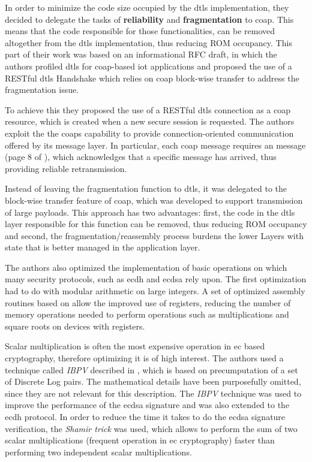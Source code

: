 \documentclass{llncs}
\begin{document}
In order to minimize the code size occupied by the \gls{dtls} implementation, they
decided to delegate the tasks of \textbf{reliability} and \textbf{fragmentation} to
\gls{coap}. This means that the code responsible for those functionalities,
can be removed altogether from the \gls{dtls} implementation, thus reducing ROM
occupancy. This part of their work was based on an informational RFC draft\cite{I-D.keoh-dtls-profile-iot}, in which the
authors profiled \gls{dtls} for \gls{coap}-based \gls{iot} applications and proposed
the use of a RESTful \gls{dtls} Handshake which relies on \gls{coap} block-wise
transfer to address the fragmentation issue.

To achieve this they  proposed the use of a RESTful \gls{dtls} connection as a \gls{coap} resource,
which is created when a new secure session is requested.
The authors exploit the the \gls{coap}s capability to provide connection-oriented
communication offered by its message layer. In particular, each 
\gls{coap} message requires an  message (page 8 of \cite{RFC7252}),
which acknowledges that a specific  message has arrived, thus
providing reliable retransmission.

Instead of leaving the fragmentation function to \gls{dtls}, it was
delegated to the block-wise transfer feature of \gls{coap}\cite{RFC7959}, which was developed
to support transmission of large payloads. This approach has two advantages: first, the code in the \gls{dtls}
layer responsible for this function can be removed, thus reducing ROM occupancy
and second, the fragmentation/reassembly process burdens the lower Layers
with state that is better managed in the application layer.

The authors also optimized the implementation of basic operations on which
many security protocols, such as \gls{ecdh} and \gls{ecdsa} rely upon. The first
optimization had to do with modular arithmetic on large integers. A set of optimized
assembly routines based on \cite{Comparin25:Online} allow the improved use of
registers, reducing the number of memory operations needed to perform
operations such as multiplications and square roots on devices with 
registers.

Scalar multiplication is often the most expensive operation in \gls{ec} based
cryptography, therefore optimizing it is of high interest. The authors used a
technique called \textit{IBPV} described in \cite{LowcostS87:online}, which is based on precumputation
of a set of Discrete Log pairs. The mathematical details have been purposefully omitted,
since they are not relevant for this description. The \textit{IBPV} technique was used
to improve the performance of the \gls{ecdsa} signature and was also extended to the
\gls{ecdh} protocol. In order to reduce the time it takes to do the \gls{ecdsa}
signature verification, the \textit{Shamir trick} was used, which allows
to perform the sum of two scalar multiplications (frequent operation in \gls{ec} cryptography)
faster than performing two independent scalar multiplications.
\end{document}
